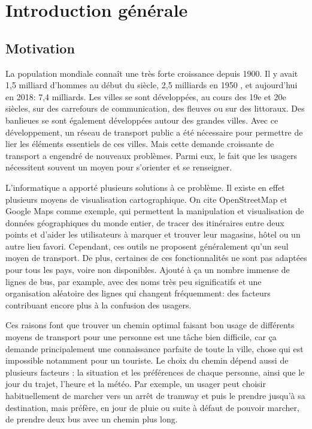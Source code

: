 \renewcommand\labelitemi{$\bullet$}
\renewcommand\labelitemii{$\circ$}
\chapter{Introduction générale}
\newpage	
\section{Motivation}
La population mondiale connaît une très forte croissance depuis 1900. 
Il y avait 1,5 milliard d'hommes au début du siècle, 2,5 milliards en 1950 , et aujourd'hui en 2018: 7,4 milliards. 
Les villes se sont développées, au cours des 19e et 20e siècles, sur des carrefours de communication, des fleuves ou sur des littoraux. Des banlieues se sont également développées autour des grandes villes. 
Avec ce développement, un réseau de transport public a été nécessaire pour permettre de lier les éléments essentiels de ces villes. 
Mais cette demande croissante de transport a engendré de nouveaux problèmes. Parmi eux, le fait que les usagers nécessitent souvent un moyen pour s'orienter et se renseigner.

L'informatique a apporté plusieurs solutions à ce problème. Il existe en effet plusieurs moyens de visualisation cartographique.
On cite OpenStreetMap et Google Maps comme exemple, qui permettent la manipulation et visualisation de données géographiques du monde entier, de tracer des itinéraires entre deux points et d'aider les utilisateurs à marquer et trouver leur magasins, hôtel ou un autre lieu favori.
Cependant, ces outils ne proposent généralement qu'un seul moyen de transport. De plus, certaines de ces fonctionnalités ne sont pas adaptées pour tous les pays, voire non disponibles.
Ajouté à ça un nombre immense de lignes de bus, par example, avec des noms très peu significatifs et une organisation aléatoire des lignes qui changent fréquemment: des facteurs contribuant encore plus à la confusion des usagers. 


Ces raisons font que trouver un chemin optimal faisant bon usage de différents moyens de transport pour une personne est une tâche bien difficile, car ça demande principalement une connaissance parfaite de toute la ville, chose qui est impossible notamment pour un touriste.
Le choix du chemin dépend aussi de plusieurs facteurs : la situation et les préférences de chaque personne, ainsi que le jour du trajet, l'heure et la météo.
Par exemple, un usager peut choisir habituellement de marcher vers un arrêt de tramway et puis le prendre jusqu'à sa destination, mais préfère, en jour de pluie ou suite à défaut de pouvoir marcher, de prendre deux bus avec un chemin plus long.

